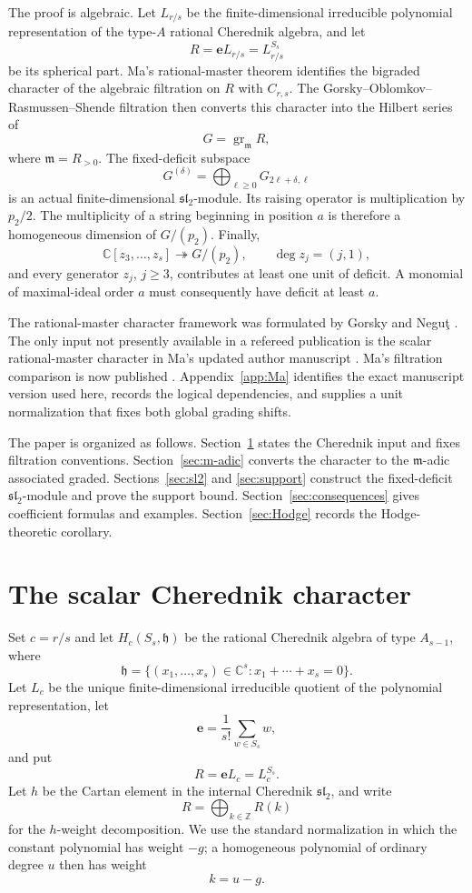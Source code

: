 \documentclass[11pt]{article}
\newcommand{\C}{\mathbb{C}}
\newcommand{\Z}{\mathbb{Z}}
\newcommand{\gr}{\operatorname{gr}}
\newcommand{\e}{\mathbf e}
\begin{document}
The proof is algebraic.  Let $L_{r/s}$ be the finite-dimensional
irreducible polynomial representation of the type-$A$ rational
Cherednik algebra, and let
\[
 R=\e L_{r/s}=L_{r/s}^{S_s}
\]
be its spherical part.  Ma's rational-master theorem identifies the
bigraded character of the algebraic filtration on $R$ with
$C_{r,s}$.  The Gorsky--Oblomkov--Rasmussen--Shende filtration then
converts this character into the Hilbert series of
\[
 G=\gr_{\mathfrak m}R,
\]
where $\mathfrak m=R_{>0}$.  The fixed-deficit subspace
\[
 G^{(\delta)}=\bigoplus_{\ell\geq0}G_{2\ell+\delta,\ell}
\]
is an actual finite-dimensional $\mathfrak{sl}_2$-module.  Its
raising operator is multiplication by $p_2/2$.  The multiplicity of a
string beginning in position $a$ is therefore a homogeneous dimension
of $G/(p_2)$.  Finally,
\[
 \C[z_3,\ldots,z_s]\twoheadrightarrow G/(p_2),
 \qquad \deg z_j=(j,1),
\]
and every generator $z_j$, $j\geq3$, contributes at least one unit of
deficit.  A monomial of maximal-ideal order $a$ must consequently
have deficit at least $a$.

The rational-master character framework was formulated by Gorsky and
Negu\c{t} \cite{GorskyNegut}.  The only input not presently available
in a refereed publication is the scalar rational-master character in
Ma's updated author manuscript \cite{MaCuspidal}.  Ma's filtration comparison is now
published \cite{MaFiltrations}.  Appendix~\ref{app:Ma} identifies the
exact manuscript version used here, records the logical dependencies,
and supplies a unit normalization that fixes both global grading
shifts.

The paper is organized as follows.  Section~\ref{sec:Cherednik-input}
states the Cherednik input and fixes filtration conventions.
Section~\ref{sec:m-adic} converts the character to the
$\mathfrak m$-adic associated graded.  Sections~\ref{sec:sl2} and
\ref{sec:support} construct the fixed-deficit $\mathfrak{sl}_2$-module
and prove the support bound.  Section~\ref{sec:consequences} gives
coefficient formulas and examples.  Section~\ref{sec:Hodge} records
the Hodge-theoretic corollary.

\section{The scalar Cherednik character}\label{sec:Cherednik-input}

Set $c=r/s$ and let $H_c(S_s,\mathfrak h)$ be the rational Cherednik
algebra of type $A_{s-1}$, where
\[
 \mathfrak h
 =\{(x_1,\ldots,x_s)\in\C^s:x_1+\cdots+x_s=0\}.
\]
Let $L_c$ be the unique finite-dimensional irreducible quotient of the
polynomial representation, let
\[
 \e=\frac1{s!}\sum_{w\in S_s}w,
\]
and put
\[
 R=\e L_c=L_c^{S_s}.
\]
Let $h$ be the Cartan element in the internal Cherednik
$\mathfrak{sl}_2$, and write
\[
 R=\bigoplus_{k\in\Z}R(k)
\]
for the $h$-weight decomposition.  We use the standard normalization
in which the constant polynomial has weight $-g$; a homogeneous
polynomial of ordinary degree $u$ then has weight
\begin{equation}\label{eq:Euler-degree}
 k=u-g.
\end{equation}
\end{document}
